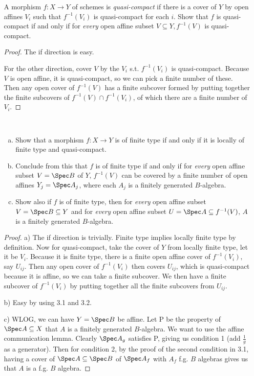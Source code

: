 \begin{exercise}%
	A morphism $f: X\to Y $ of schemes is \textit{quasi-compact} if there is a cover of $Y $ by open affines $V_i$ such that $f^{-1}(V_i) $ is quasi-compact for each $i $. Show that $f $ is quasi-compact if and only if for \textit{every} open affine subset $V\subseteq Y, f^{-1}(V) $ is quasi-compact.
\end{exercise}
\begin{proof}
	The if direction is easy.

	For the other direction, cover $V $ by the $V_i $ s.t. $f^{-1}(V_i) $ is quasi-compact.
	Because $V $ is open affine, it is quasi-compact, so we can pick a finite number of these.
	Then any open cover of $f^{-1}(V) $ has a finite subcover formed by putting together the finite subcovers of $f^{-1}(V) \cap f^{-1}(V_i) $, of which there are a finite number of $V_i $.
\end{proof}

\begin{exercise}%
	~
	\begin{enumerate}[(a)]
		\item Show that a morphism $f: X\to Y $ is of finite type if and only if it is locally of finite type and quasi-compact.
		\item Conclude from this that $f $ is of finite type if and only if for \textit{every} open affine subset $V = \Spec B $ of $Y $, $f^{-1}(V) $ can be covered by a finite number of open affines $Y_j = \Spec A_j $, where each $A_j $ is a finitely generated $B $-algebra.
		\item Show also if $f $ is of finite type, then for \textit{every} open affine subset $V = \Spec B \subseteq  Y $ and for \textit{every} open affine subset $U = \Spec A \subseteq f^{-1}(V) $, $A $ is a finitely generated $B $-algebra.
	\end{enumerate}
\end{exercise}
\begin{proof}
	a) The if direction is trivially.
	Finite type implies locally finite type by definition.
	Now for quasi-compact, take the cover of $Y $ from locally finite type, let it be $V_i $.
	Because it is finite type, there is a finite open affine cover of $f^{-1}(V_i) $, say $U_{ij} $.
	Then any open cover of $f^{-1}(V_i) $ then covers $U_{ij} $, which is quasi-compact because it is affine, so we can take a finite subcover.
	We then have a finite subcover of $f^{-1}(V_i) $ by putting together all the finite subcovers from $U_{ij} $.

	b) Easy by using 3.1 and 3.2.

	c) WLOG, we can have $Y=\Spec B $ be affine. Let P be the property of $\Spec A \subseteq X$ that $A $ is a finitely generated $B $-algebra.
	We want to use the affine communication lemma.
	Clearly $\Spec A_g $ satisfies P, giving us condition 1 (add $\frac{1}{g} $ as a generator).
	Then for condition 2, by the proof of the second condition in 3.1, having a cover of $\Spec A\subseteq \Spec B $ of $\Spec A_f $ with $A_f $ f.g. $B $ algebras gives us that $A $ is a f.g. $B $ algebra.
\end{proof}

